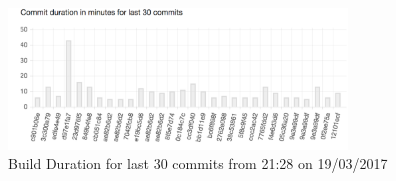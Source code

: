\begin{figure}
\begin{center}
\includegraphics[width=9cm]{figures/cicd_build_duration}
\end{center}
\caption{Build Duration for last 30 commits from 21:28 on 19/03/2017}
\label{fig:cicd_build_duration}
\end{figure}